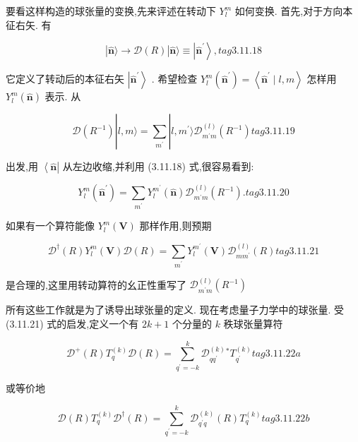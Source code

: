 要看这样构造的球张量的变换,先来评述在转动下 ${Y}_{l}^{m}$ 如何变换. 首先,对于方向本征右矢. 有

$$
\left| {\widehat{\mathbf{n}}\rangle \rightarrow \mathcal{D}\left( R\right) }\right| \widehat{\mathbf{n}}\rangle \equiv \left| {\widehat{\mathbf{n}}}^{\prime }\right\rangle , tag{3.11.18}
$$

它定义了转动后的本征右矢 $\left| {\widehat{\mathbf{n}}}^{\prime }\right\rangle$ . 希望检查 ${Y}_{l}^{m}\left( {\widehat{\mathbf{n}}}^{\prime }\right) = \left\langle {{\widehat{\mathbf{n}}}^{\prime } \mid l, m}\right\rangle$ 怎样用 ${Y}_{l}^{m}\left( \widehat{\mathbf{n}}\right)$ 表示. 从

$$
\mathcal{D}\left( {R}^{-1}\right) \left| {l, m\rangle = \mathop{\sum }\limits_{{m}^{\prime }}}\right| l,{m}^{\prime }\rangle {\mathcal{D}}_{{m}^{\prime }m}^{\left( l\right) }\left( {R}^{-1}\right) tag{3.11.19}
$$

出发,用 $\left\langle \widehat{\mathbf{n}}\right|$ 从左边收缩,并利用 (3.11.18) 式,很容易看到:

$$
{Y}_{l}^{m}\left( {\widehat{\mathbf{n}}}^{\prime }\right) = \mathop{\sum }\limits_{{m}^{\prime }}{Y}_{l}^{{m}^{\prime }}\left( \widehat{\mathbf{n}}\right) {\mathcal{D}}_{{m}^{\prime }m}^{\left( l\right) }\left( {R}^{-1}\right) . tag{3.11.20}
$$

如果有一个算符能像 ${Y}_{l}^{m}\left( \mathbf{V}\right)$ 那样作用,则预期

$$
{\mathcal{D}}^{ \dagger }\left( R\right) {Y}_{l}^{m}\left( \mathbf{V}\right) \mathcal{D}\left( R\right) = \mathop{\sum }\limits_{{m}^{\prime }}{Y}_{l}^{{m}^{\prime }}\left( \mathbf{V}\right) {\mathcal{D}}_{m{m}^{\prime }}^{\left( l\right) }\left( R\right) tag{3.11.21}
$$

是合理的,这里用转动算符的幺正性重写了 ${\mathcal{D}}_{{m}^{\prime }m}^{\left( l\right) }\left( {R}^{-1}\right)$

所有这些工作就是为了诱导出球张量的定义. 现在考虑量子力学中的球张量. 受 (3.11.21) 式的启发,定义一个有 ${2k} + 1$ 个分量的 $k$ 秩球张量算符

$$
{\mathcal{D}}^{ + }\left( R\right) {T}_{q}^{\left( k\right) }\mathcal{D}\left( R\right) = \mathop{\sum }\limits_{{{q}^{\prime } = - k}}^{k}{\mathcal{D}}_{q{q}^{\prime }}^{\left( k\right) }{}^{ * }{T}_{{q}^{\prime }}^{\left( k\right) } tag{3.11.22a}
$$

或等价地

$$
\mathcal{D}\left( R\right) {T}_{q}^{\left( k\right) }{\mathcal{D}}^{ \dagger }\left( R\right) = \mathop{\sum }\limits_{{{q}^{\prime } = - k}}^{k}{\mathcal{D}}_{{q}^{\prime }q}^{\left( k\right) }\left( R\right) {T}_{q}^{\left( k\right) } tag{3.11.22b}
$$

